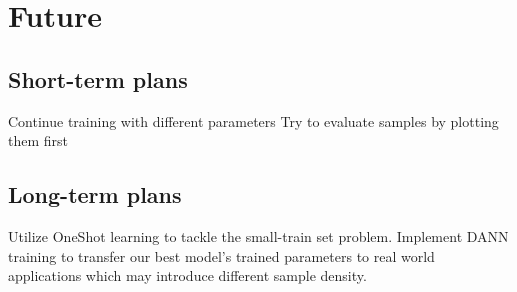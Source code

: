 \chapter{Future}

\section{Short-term plans}
Continue training with different parameters
Try to evaluate samples by plotting them first

\section{Long-term plans}
Utilize OneShot learning to tackle the small-train set problem.
Implement DANN training to transfer our best model's trained parameters to real world applications which may introduce different sample density.

